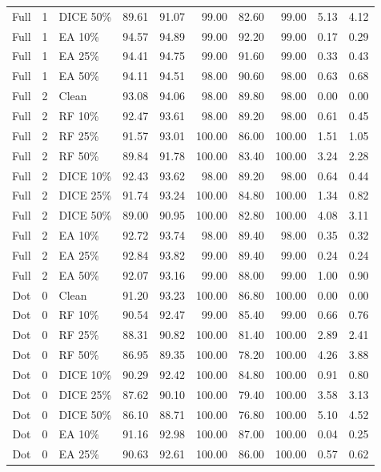 {\begin{longtable}{rllrrrrrrr}
Full & 1 & DICE 50\% & 89.61 & 91.07 & 99.00 & 82.60 & 99.00 & 5.13 & 4.12 \\
Full & 1 & EA 10\% & 94.57 & 94.89 & 99.00 & 92.20 & 99.00 & 0.17 & 0.29 \\
Full & 1 & EA 25\% & 94.41 & 94.75 & 99.00 & 91.60 & 99.00 & 0.33 & 0.43 \\
Full & 1 & EA 50\% & 94.11 & 94.51 & 98.00 & 90.60 & 98.00 & 0.63 & 0.68 \\
Full & 2 & Clean & 93.08 & 94.06 & 98.00 & 89.80 & 98.00 & 0.00 & 0.00 \\
Full & 2 & RF 10\% & 92.47 & 93.61 & 98.00 & 89.20 & 98.00 & 0.61 & 0.45 \\
Full & 2 & RF 25\% & 91.57 & 93.01 & 100.00 & 86.00 & 100.00 & 1.51 & 1.05 \\
Full & 2 & RF 50\% & 89.84 & 91.78 & 100.00 & 83.40 & 100.00 & 3.24 & 2.28 \\
Full & 2 & DICE 10\% & 92.43 & 93.62 & 98.00 & 89.20 & 98.00 & 0.64 & 0.44 \\
Full & 2 & DICE 25\% & 91.74 & 93.24 & 100.00 & 84.80 & 100.00 & 1.34 & 0.82 \\
Full & 2 & DICE 50\% & 89.00 & 90.95 & 100.00 & 82.80 & 100.00 & 4.08 & 3.11 \\
Full & 2 & EA 10\% & 92.72 & 93.74 & 98.00 & 89.40 & 98.00 & 0.35 & 0.32 \\
Full & 2 & EA 25\% & 92.84 & 93.82 & 99.00 & 89.40 & 99.00 & 0.24 & 0.24 \\
Full & 2 & EA 50\% & 92.07 & 93.16 & 99.00 & 88.00 & 99.00 & 1.00 & 0.90 \\
Dot & 0 & Clean & 91.20 & 93.23 & 100.00 & 86.80 & 100.00 & 0.00 & 0.00 \\
Dot & 0 & RF 10\% & 90.54 & 92.47 & 99.00 & 85.40 & 99.00 & 0.66 & 0.76 \\
Dot & 0 & RF 25\% & 88.31 & 90.82 & 100.00 & 81.40 & 100.00 & 2.89 & 2.41 \\
Dot & 0 & RF 50\% & 86.95 & 89.35 & 100.00 & 78.20 & 100.00 & 4.26 & 3.88 \\
Dot & 0 & DICE 10\% & 90.29 & 92.42 & 100.00 & 84.80 & 100.00 & 0.91 & 0.80 \\
Dot & 0 & DICE 25\% & 87.62 & 90.10 & 100.00 & 79.40 & 100.00 & 3.58 & 3.13 \\
Dot & 0 & DICE 50\% & 86.10 & 88.71 & 100.00 & 76.80 & 100.00 & 5.10 & 4.52 \\
Dot & 0 & EA 10\% & 91.16 & 92.98 & 100.00 & 87.00 & 100.00 & 0.04 & 0.25 \\
Dot & 0 & EA 25\% & 90.63 & 92.61 & 100.00 & 86.00 & 100.00 & 0.57 & 0.62 \\

\end{longtable}}
